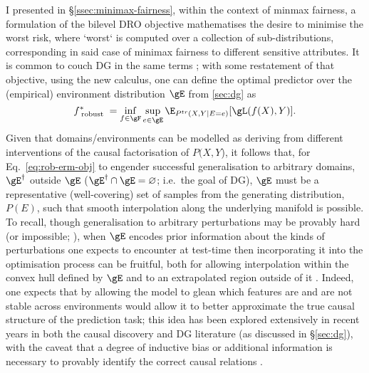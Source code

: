 %
%
I presented in \S\ref{ssec:minimax-fairness}, within the context of minmax fairness, a formulation
of the bilevel \ac{DRO} objective mathematises the desire to minimise the worst risk, where `worst`
is computed over a collection of sub-distributions, corresponding in said case of minimax fairness
to different sensitive attributes.
%
It is common to couch \ac{DG} in the same terms \citep{arjovsky2019invariant, krueger2021out,
sagawa2019distributionally}; with some restatement of that objective, using the new calculus, one
can define the optimal predictor over the (empirical) environment distribution \(\gE\) from
\ref{sec:dg} as
%
\begin{equation}\label{eq:rob-erm-obj} 
    f^\ast_\text{ robust } =
    \underset{ f \in \gF }{ \mathrm{inf} }\, 
    \underset{ e \in \gE}{ \mathrm{sup} }\,
    \E_{ P^{tr}( X, Y | E = e ) } [ \gL ( f( X ), Y ) ]. 
\end{equation}
%
Given that domains/environments can be modelled as deriving from different interventions of the
causal factorisation of \(P(X, Y\)), it follows that, for Eq.~\ref{eq:rob-erm-obj} to engender
successful generalisation to arbitrary domains, \(\gE^\dagger\) outside \(\gE\) (\( \gE^\dagger
\cap \gE = \varnothing \); i.e.\ the goal of \ac{DG}), \(\gE\) must be a representative
(well-covering) set of samples from the generating distribution, \( P(E) \), such that smooth
interpolation along the underlying manifold is possible.
%
To recall, though generalisation to arbitrary perturbations may be provably hard (or impossible;
\citealp{david2010impossibility}), when \(\gE\) encodes prior information about the kinds of
perturbations one expects to encounter at test-time then incorporating it into the optimisation
process can be fruitful, both for allowing interpolation within the convex hull defined by \(\gE\)
and to an extrapolated region outside of it \citep{krueger2021out}.
%
Indeed, one expects that by allowing the model to glean which features are and are not stable
across environments would allow it to better approximate the true causal structure of the
prediction task;
%
this idea has been explored extensively in recent years in both the causal discovery
\citep{peters2016causal, bengio2019meta} and \ac{DG} \citep{arjovsky2019invariant,
ahuja2020invariant, creager2021environment} literature (as discussed in \S\ref{sec:dg}), with the
caveat that a degree of inductive bias or additional information is necessary to provably identify
the correct causal relations \citep{lin2022zin}.
%

